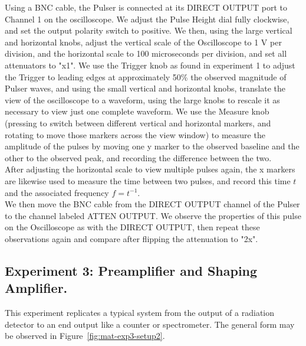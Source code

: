 \documentclass[12pt]{article}
\begin{document}
Using a BNC cable, the Pulser is connected at its DIRECT OUTPUT port to Channel 1 on the oscilloscope.
We adjust the Pulse Height dial fully clockwise, and set the output polarity switch to positive.
We then, using the large vertical and horizontal knobs, adjust the vertical scale of the Oscilloscope to 1 V per division, and the horizontal scale to 100 microseconds per division, and set all attenuators to "x1".
We use the Trigger knob as found in experiment 1 to adjust the Trigger to leading edges at approximately 50\% the observed magnitude of Pulser waves, and using the small vertical and horizontal knobs, translate the view of the oscilloscope to a waveform, using the large knobs to rescale it as necessary to view just one complete waveform. We use the Measure knob (pressing to switch between different vertical and horizontal markers, and rotating to move those markers across the view window) to measure the amplitude of the pulses by moving one y marker to the observed baseline and the other to the observed peak, and recording the difference between the two.\\

After adjusting the horizontal scale to view multiple pulses again, the x markers are likewise used to measure the time between two pulses, and record this time $t$ and the associated frequency $f=t^{-1}$. \\

We then move the BNC cable from the DIRECT OUTPUT channel of the Pulser to the channel labeled ATTEN OUTPUT. We observe the properties of this pulse on the Oscilloscope as with the DIRECT OUTPUT, then repeat these observations again and compare after flipping the attenuation to "2x". 

\subsection{Experiment 3: Preamplifier and Shaping Amplifier.}
This experiment replicates a typical system from the output of a radiation detector to an end output like a counter or spectrometer. The general form may be observed in Figure~\ref{fig:mat-exp3-setup2}.\\
\end{document}
